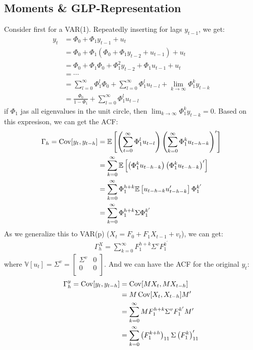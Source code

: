 \subsection{Moments \& GLP-Representation}
Consider first for a VAR(1). Repeatedly inserting for lags $y_{t-1}$, we get:
\begin{align*}
    y_t &= \Phi_0 + \Phi_1 y_{t-1} + u_t \\
    &= \Phi_0 + \Phi_1 (\Phi_0 + \Phi_1 y_{t-2} + u_{t-1}) + u_t \\
    &= \Phi_0 + \Phi_1 \Phi_0 + \Phi_1^2 y_{t-2} + \Phi_1 u_{t-1} + u_t \\
    &= \cdots \\
    &= \sum_{l=0}^{\infty} \Phi_1^l \Phi_0 + \sum_{l=0}^{\infty} \Phi_1^l u_{t-l} + \lim_{k \to \infty} \Phi_1^k y_{t-k} \\
    &= \frac{\Phi_0}{1 - \Phi_1} + \sum_{l=0}^{\infty} \Phi_1^l u_{t-l}
\end{align*}
if $\Phi_1$ jas all eigenvalues in the unit circle, then $\lim_{k \to \infty} \Phi_1^k y_{t-k} = 0$.
Based on this expresison, we can get the ACF:
\begin{align*}
    \Gamma_h = \operatorname{Cov}[y_t, y_{t-h}] &= \mathbb{E}\left[ \left(\sum_{t=0}^{\infty}\Phi_1^l u_{t-l} \right) \left( \sum_{k=0}^{\infty}\Phi_1^k u_{t-h-k} \right)^{\prime} \right] \\
    &= \sum_{k=0}^{\infty} \mathbb{E}\left[ \left(\Phi_1^k u_{t-h-k} \right) \left(\Phi_1^k u_{t-h-k} \right)^{\prime} \right] \\
    &= \sum_{k=0}^{\infty} \Phi_1^{h+k}  \mathbb{E}\left[ u_{t-h-k} u_{t-h-k}^{\prime} \right] \Phi_1^{k^{\prime}} \\
    &= \sum_{k=0}^{\infty} \Phi_1^{h+k} \Sigma \Phi_1^{k^{\prime}}
\end{align*}
As we generalize this to VAR(p) ($X_t = F_0 + F_1 X_{t-1} + v_t$), we can get:
\begin{gather*}
    \Gamma_h^X = \sum_{k=0}^{\infty} F_1^{h+k} \Sigma^v F_1^{k^{\prime}}
\end{gather*}
where $\mathbb{V}[u_t] = \Sigma^v = \begin{bmatrix}
    \Sigma^v & 0 \\
    0 & 0 \\
\end{bmatrix}$.
And we can have the ACF for the original $y_t$:
\begin{align*}
    \Gamma_h^y = \operatorname{Cov}[y_t, y_{t-h}] &= \operatorname{Cov}[MX_t, MX_{t-h}] \\
    &= M \operatorname{Cov}[X_t, X_{t-h}] M^{\prime} \\
    &= \sum_{k=0}^{\infty} M F_1^{h+k} \Sigma^v F_1^{k^{\prime}} M^{\prime} \\
    &= \sum_{k=0}^{\infty} \left(F_1^{k+h} \right)_{11} \Sigma \left( F_1^k \right)_{11}^{\prime}
\end{align*}

